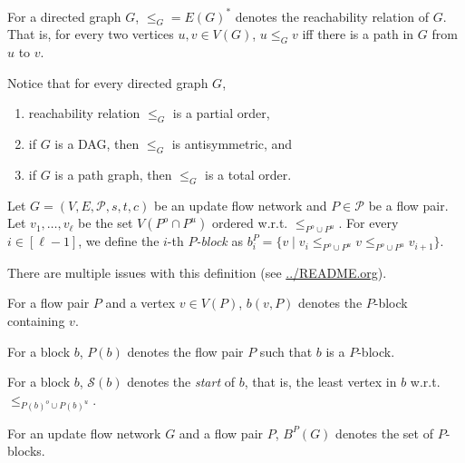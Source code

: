\documentclass[fontsize=11pt,paper=a4]{book}
\begin{document}
\begin{notation}
For a directed graph \(G\), \(\leq_G=E(G)^*\) denotes the reachability relation of \(G\).
That is, for every two vertices \(u,v\in V(G)\), \(u\leq_Gv\) iff there is a path in \(G\) from \(u\) to \(v\).
\label{orgc40fbed}
\end{notation}

Notice that for every directed graph \(G\),

\begin{enumerate}
\item reachability relation \(\leq_G\) is a partial order,

\item if \(G\) is a DAG, then \(\leq_G\) is antisymmetric, and

\item if \(G\) is a path graph, then \(\leq_G\) is a total order.
\end{enumerate}

\begin{defn}
Let \(G=(V,E,\mathcal{P},s,t,c)\) be an update flow network and \(P\in\mathcal{P}\) be a flow pair.
Let \(v_1,\dots,v_{\ell}\) be the set \(V(P^o\cap P^u)\) ordered w.r.t. \(\leq_{P^o\cup P^u}\).
For every \(i\in[\ell-1]\), we define the \(i\)-th \emph{\(P\)-block} as \(b_i^P=\{v\mid v_i\leq_{P^o\cup P^u}v\leq_{P^o\cup P^u}v_{i+1}\}\).
\label{org9a8ac46}
\end{defn}

\begin{remark}
There are multiple issues with this definition (see \url{../README.org}).
\end{remark}

\begin{notation}
For a flow pair \(P\) and a vertex \(v\in V(P)\), \(b(v,P)\) denotes the \(P\)-block containing \(v\).
\label{org6c1d07b}
\end{notation}

\begin{notation}
For a block \(b\), \(P(b)\) denotes the flow pair \(P\) such that \(b\) is a \(P\)-block.
\label{orgd3dd3c7}
\end{notation}

\begin{notation}
For a block \(b\), \(\mathcal{S}(b)\) denotes the \emph{start} of \(b\), that is, the least vertex in \(b\) w.r.t. \(\leq_{P(b)^o\cup P(b)^u}\).
\label{org48541ca}
\end{notation}

\begin{notation}
For an update flow network \(G\) and a flow pair \(P\), \(B^P(G)\) denotes the set of \(P\)-blocks.
\label{orgd08d3dd}
\end{notation}
\end{document}
